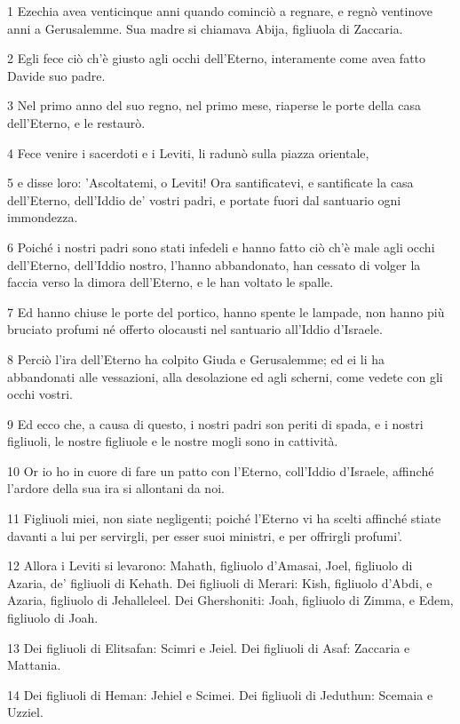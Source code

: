 \par 1 Ezechia avea venticinque anni quando cominciò a regnare, e regnò ventinove anni a Gerusalemme. Sua madre si chiamava Abija, figliuola di Zaccaria.
\par 2 Egli fece ciò ch'è giusto agli occhi dell'Eterno, interamente come avea fatto Davide suo padre.
\par 3 Nel primo anno del suo regno, nel primo mese, riaperse le porte della casa dell'Eterno, e le restaurò.
\par 4 Fece venire i sacerdoti e i Leviti, li radunò sulla piazza orientale,
\par 5 e disse loro: 'Ascoltatemi, o Leviti! Ora santificatevi, e santificate la casa dell'Eterno, dell'Iddio de' vostri padri, e portate fuori dal santuario ogni immondezza.
\par 6 Poiché i nostri padri sono stati infedeli e hanno fatto ciò ch'è male agli occhi dell'Eterno, dell'Iddio nostro, l'hanno abbandonato, han cessato di volger la faccia verso la dimora dell'Eterno, e le han voltato le spalle.
\par 7 Ed hanno chiuse le porte del portico, hanno spente le lampade, non hanno più bruciato profumi né offerto olocausti nel santuario all'Iddio d'Israele.
\par 8 Perciò l'ira dell'Eterno ha colpito Giuda e Gerusalemme; ed ei li ha abbandonati alle vessazioni, alla desolazione ed agli scherni, come vedete con gli occhi vostri.
\par 9 Ed ecco che, a causa di questo, i nostri padri son periti di spada, e i nostri figliuoli, le nostre figliuole e le nostre mogli sono in cattività.
\par 10 Or io ho in cuore di fare un patto con l'Eterno, coll'Iddio d'Israele, affinché l'ardore della sua ira si allontani da noi.
\par 11 Figliuoli miei, non siate negligenti; poiché l'Eterno vi ha scelti affinché stiate davanti a lui per servirgli, per esser suoi ministri, e per offrirgli profumi'.
\par 12 Allora i Leviti si levarono: Mahath, figliuolo d'Amasai, Joel, figliuolo di Azaria, de' figliuoli di Kehath. Dei figliuoli di Merari: Kish, figliuolo d'Abdi, e Azaria, figliuolo di Jehalleleel. Dei Ghershoniti: Joah, figliuolo di Zimma, e Edem, figliuolo di Joah.
\par 13 Dei figliuoli di Elitsafan: Scimri e Jeiel. Dei figliuoli di Asaf: Zaccaria e Mattania.
\par 14 Dei figliuoli di Heman: Jehiel e Scimei. Dei figliuoli di Jeduthun: Scemaia e Uzziel.
